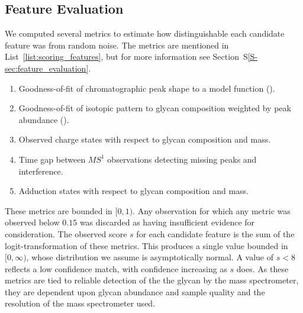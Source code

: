 \subsection{Feature Evaluation}
    We computed several metrics to estimate
    how distinguishable each candidate feature was from random noise. The
    metrics are mentioned in List~\ref{list:scoring_features}, but for more
    information see Section~S\ref{S-sec:feature_evaluation}.
    \begin{ordlist}
    \begin{enumerate}
        \itemsep0em
        \caption{Chromatographic Feature Metrics\label{list:scoring_features}}
        \item Goodness-of-fit of chromatographic peak shape to a model function
              (\cite{Yu2010,Kronewitter2014}).
        \item Goodness-of-fit of isotopic pattern to glycan composition weighted
              by peak abundance (\cite{Maxwell2012}).
        \item Observed charge states with respect to glycan composition and mass.
        \item Time gap between $MS^1$ observations detecting missing peaks
              and interference.
        \item Adduction states with respect to glycan composition and mass.
    \end{enumerate}
    \end{ordlist}

    These metrics are bounded in $[0, 1)$. Any observation for which any metric
    was observed below $0.15$ was discarded as having insufficient evidence for
    consideration. The observed score $s$ for each candidate feature is
    the sum of the logit-transformation of these metrics. This produces a single
    value bounded in $[0, \infty)$, whose distribution we assume is asymptotically
    normal. A value of $s < 8$ reflects a low confidence match, with confidence increasing
    as $s$ does. As these metrics are tied to reliable detection of the the glycan
    by the mass spectrometer, they are dependent upon glycan abundance and sample
    quality and the resolution of the mass spectrometer used.
